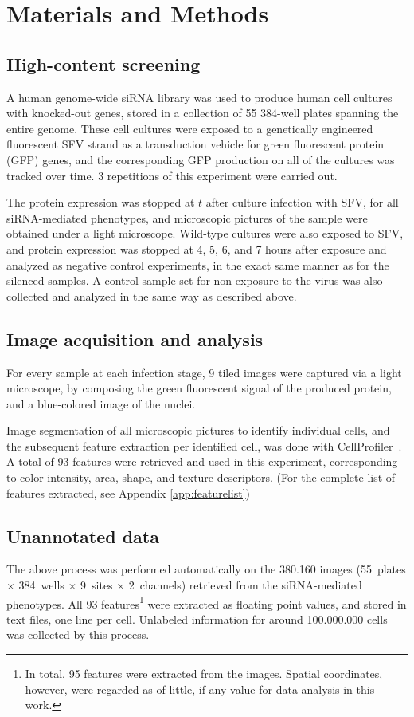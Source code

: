 \documentclass[oneside, a4paper, draft]{memoir} %
\begin{document}
\section{Materials and Methods}
\subsection{High-content screening}
A human genome-wide siRNA library was used to produce human cell cultures with knocked-out
genes, stored in a collection of 55 384-well plates spanning the entire genome. 
These cell cultures were exposed to a genetically engineered fluorescent SFV strand as a transduction vehicle for 
green fluorescent protein (GFP) genes, and the corresponding GFP production on all of the cultures was tracked over
time. 3 repetitions of this experiment were carried out.

The protein expression was stopped at $t$ after culture infection with SFV, for all siRNA-mediated
phenotypes, and microscopic pictures of the sample were obtained under a light microscope.
Wild-type cultures were also exposed to SFV, and protein expression was stopped at 4, 5, 6, and 7 hours after exposure
and analyzed as negative control experiments, in the exact same manner as for the silenced
samples. A control sample set for non-exposure to the virus was also collected and analyzed in the same way
as described above.


\subsection{Image acquisition and analysis}
For every sample at each infection stage, 9 tiled images were captured via a light microscope, by composing the
green fluorescent signal of the produced protein, and a blue-colored image of the nuclei.

Image segmentation of all microscopic pictures to identify individual cells, and the subsequent feature extraction per
identified cell, was done with CellProfiler~\cite{carpenter2006cellprofiler}.
A total of 93 features were retrieved and used in this experiment, corresponding to color intensity, area, shape, and
texture descriptors. (For the complete list of features extracted, see Appendix \ref{app:featurelist})

\subsection{Unannotated data}
The above process was performed automatically on the 380.160 images (55~plates $\times$ 384~wells $\times$ 
9~sites $\times$ 2~channels) retrieved from the siRNA-mediated phenotypes.
All 93 features\footnote{In total, 95 features were extracted
from the images. Spatial coordinates, however, were regarded as of little, if any value for data analysis in this
work.} were extracted as floating point values, and stored in text files, one line per cell. Unlabeled information for
around 100.000.000 cells was collected by this process.
\end{document}
